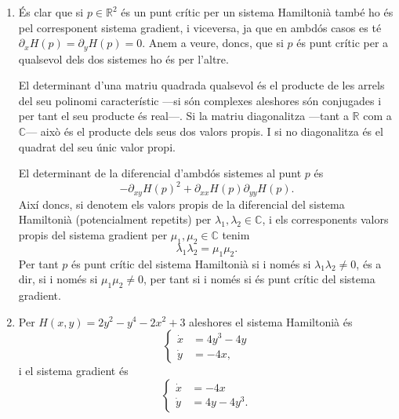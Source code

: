 \documentclass[12pt]{article}
\newcommand{\R}{\mathbb{R}}
\newcommand{\C}{\mathbb{C}}
\begin{document}
\begin{enumerate}[label=(\roman*), font=\bfseries \sffamily, wide, labelwidth=!, labelindent=0pt]
	\item	És clar que si \( p \in \R^2 \) és un punt crític per un sistema Hamiltonià també ho és pel corresponent sistema gradient, i viceversa, ja que en ambdós casos es té \( \partial_x H(p) = \partial_y H(p) = 0 \). Anem a veure, doncs, que si \( p \) és punt crític per a qualsevol dels dos sistemes ho és per l'altre.   

		El determinant d'una matriu quadrada qualsevol és el producte de les arrels del seu polinomi característic ---si són complexes aleshores són conjugades i per tant el seu producte és real---. Si la matriu diagonalitza ---tant a \( \R \) com a \( \C	\)--- això és el producte dels seus dos valors propis. I si no diagonalitza és el quadrat del seu únic valor propi. 

		El determinant de la diferencial d'ambdós sistemes al punt \( p \) és
		\begin{equation*}
			- \partial_{xy}H(p)^2 + \partial_{xx}H(p) \partial_{yy}H(p).
		\end{equation*}
		Així doncs, si denotem els valors propis de la diferencial del sistema Hamiltonià (potencialment repetits) per \( \lambda_1, \lambda_2 \in \C \), i els corresponents valors propis del sistema gradient per \( \mu_1, \mu_2 \in \C \) tenim
		\begin{equation*}
			\lambda_1 \lambda_2 = \mu_1 \mu_2.
		\end{equation*}
		Per tant \( p \) és punt crític del sistema Hamiltonià si i només si \( \lambda_1 \lambda_2 \neq 0 \), és a dir, si i només si \( \mu_1 \mu_2 \neq 0 \), per tant si i només si és punt crític del sistema gradient. 

	\item Per \( H(x,y) = 2y^2 - y^4 - 2x^2 + 3 \) aleshores el sistema Hamiltonià és 
		\begin{equation}\label{eq:hamiltonia}
			\left\{ 
				\begin{aligned}
					\dot{x} & = 4y^3 - 4y \\
					\dot{y} & = -4x,
				\end{aligned} 
			\right. 
		\end{equation}
		i el sistema gradient és 
		\begin{equation}\label{eq:gradient}
			\left\{ 
				\begin{aligned}
					\dot{x} & = -4x \\
					\dot{y} & = 4y - 4y^3.
				\end{aligned} 
			\right. 
		\end{equation}


\end{enumerate}
\end{document}

